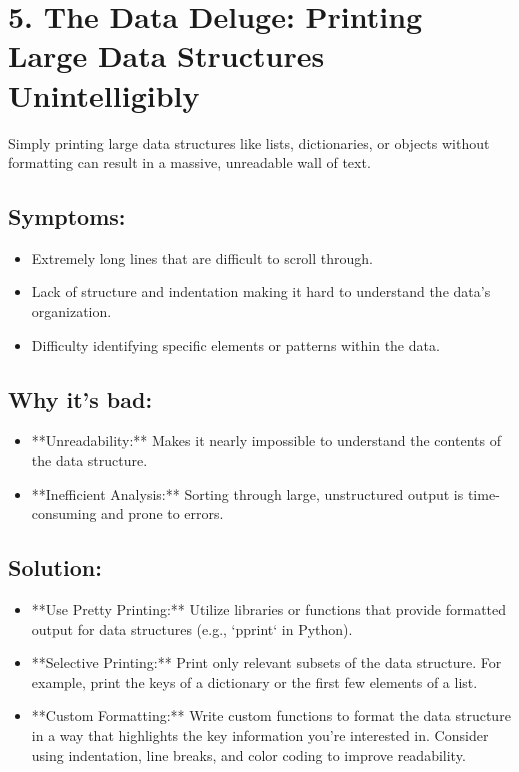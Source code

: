 \documentclass{article}
\begin{document}
\section*{5. The Data Deluge: Printing Large Data Structures Unintelligibly}

Simply printing large data structures like lists, dictionaries, or objects without formatting can result in a massive, unreadable wall of text.

\subsection*{Symptoms:}

\begin{itemize}
    \item  Extremely long lines that are difficult to scroll through.
    \item  Lack of structure and indentation making it hard to understand the data's organization.
    \item  Difficulty identifying specific elements or patterns within the data.
\end{itemize}

\subsection*{Why it's bad:}

\begin{itemize}
    \item **Unreadability:** Makes it nearly impossible to understand the contents of the data structure.
    \item **Inefficient Analysis:**  Sorting through large, unstructured output is time-consuming and prone to errors.
\end{itemize}

\subsection*{Solution:}

\begin{itemize}
    \item **Use Pretty Printing:** Utilize libraries or functions that provide formatted output for data structures (e.g., `pprint` in Python).
    \item **Selective Printing:**  Print only relevant subsets of the data structure. For example, print the keys of a dictionary or the first few elements of a list.
    \item **Custom Formatting:**  Write custom functions to format the data structure in a way that highlights the key information you're interested in.  Consider using indentation, line breaks, and color coding to improve readability.
\end{itemize}
\end{document}
